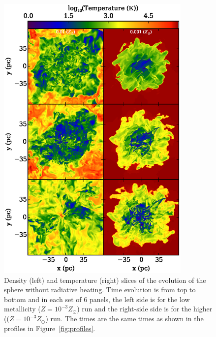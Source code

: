 \documentclass[useAMS,usenatbib]{mn2e}
\begin{document}
\begin{figure}
\begin{center}
\includegraphics[width=9.5cm]{Images/temperature_panel} 
\end{center}
\caption{\label{fig:number_density_panel} Density (left) and temperature (right) slices of the evolution of the sphere without radiative heating.  Time evolution is from top to bottom and in each set of 6 panels, the left side is for the low metallicity ($Z=10^{-3}Z_\odot$) run and the right-side side is for the higher (($Z=10^{-3}Z_\odot$) run.  The times are the same times as shown in the profiles in Figure~\ref{fig:profiles}.  }
\end{figure}
\end{document}
